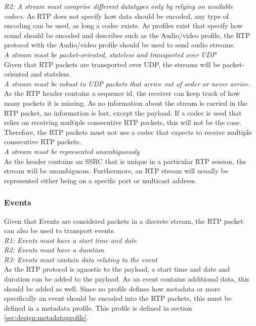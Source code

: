 \noindent\textit{R2: A stream must comprise different datatypes only by relying on available codecs.}
As RTP does not specify how data should be encoded, any type of encoding can be used, as long a codec exists. As profiles exist that specify how sound should be encoded and describes such as the Audio/video profile, the RTP protocol with the Audio/video profile should be used to send audio streams.\\

\noindent\textit{A stream must be packet-oriented, stateless and transported over UDP} \\
Given that RTP packets are transported over UDP, the streams will be packet-oriented and stateless.\\

\noindent\textit{A stream must be robust to UDP packets that arrive out of order or never arrive.} \\
As the RTP header contains a sequence id, the receiver can keep track of how many packets it is missing. As no information about the stream is carried in the RTP packet, no information is lost, except the payload. If a codec is used that relies on receiving multiple consecutive RTP packets, this will not be the case. Therefore, the RTP packets must not use a codec that expects to receive  multiple consecutive RTP packets. \\

\noindent\textit{A stream must be represented unambiguously} \\
As the header contains an SSRC that is unique in a particular RTP session, the stream will be unambiguous. Furthermore, an RTP stream will usually be represented either being on a specific port or multicast address.


\subsubsection{Events}
Given that Events are considered packets in a discrete stream, the RTP packet can also be used to transport events.\\

\noindent \textit{R1: Events must have a start time and date}\\
\textit{R2: Events must have a duration}\\
\textit{R3: Events must contain data relating to the event} \\
As the RTP protocol is agnostic to the payload, a start time and date and duration can be added to the payload. As an event contains additional data,  this should be added as well. Since no profile defines how metadata or more specifically an event should be encoded into the RTP packets, this must be defined in a metadata profile. This profile is defined in section \ref{sec:design:metadataprofile}. 


